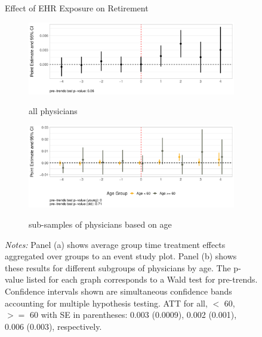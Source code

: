 \documentclass[12pt]{article}
\begin{document}
\begin{figure}[ht!]
\centering
    \captionsetup{width=.7\linewidth}
    \caption{Effect of EHR Exposure on Retirement}
   \begin{subfigure}[]{.8\textwidth}
   \caption{all physicians}
   \includegraphics[scale=.45]{Objects/retire_plot_all.pdf}
   \label{fig:retirefirst} 
\end{subfigure}

\vspace{3mm}

\begin{subfigure}[]{.8\textwidth}
\caption{sub-samples of physicians based on age}
   \includegraphics[scale=.45]{Objects/retire_plot_ages.pdf}
   \label{fig:retiresecond}
\end{subfigure}
\vspace{2mm}
    \caption*{\footnotesize{\textit{Notes:} Panel (a) shows average group time treatment effects aggregated over groups to an event study plot. Panel (b) shows these results for different subgroups of physicians by age. The p-value listed for each graph corresponds to a Wald test for pre-trends. Confidence intervals shown are simultaneous confidence bands accounting for multiple hypothesis testing. ATT for all, $<$ 60, $>=$ 60 with SE in parentheses: 0.003 (0.0009), 0.002 (0.001), 0.006 (0.003), respectively.}}
\end{figure}
\end{document}
